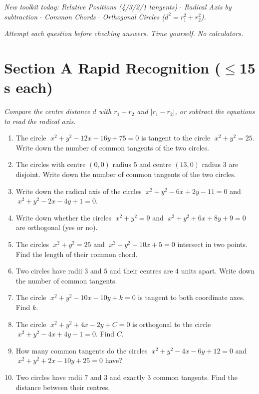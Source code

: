 \documentclass[11pt,a4paper]{article}
\begin{document}
\noindent\textit{New toolkit today: Relative Positions (4/3/2/1 tangents) $\cdot$ Radical Axis by subtraction $\cdot$ Common Chords $\cdot$ Orthogonal Circles ($d^2=r_1^2+r_2^2$).}

\vspace{2pt}
\noindent\textit{Attempt each question before checking answers. Time yourself. No calculators.}

\section*{Section A \quad Rapid Recognition \hfill{\normalfont\small($\leq$15 s each)}}

\noindent\textit{Compare the centre distance $d$ with $r_1+r_2$ and $|r_1-r_2|$, or subtract the equations to read the radical axis.}

\begin{enumerate}

\item The circle $\;x^2+y^2-12x-16y+75=0$ is tangent to the circle $\;x^2+y^2=25$. Write down the number of common tangents of the two circles.

\item The circles with centre $(0,0)$ radius $5$ and centre $(13,0)$ radius $3$ are disjoint. Write down the number of common tangents of the two circles.

\item Write down the radical axis of the circles $\;x^2+y^2-6x+2y-11=0$ and $\;x^2+y^2-2x-4y+1=0$.

\item Write down whether the circles $\;x^2+y^2=9$ and $\;x^2+y^2+6x+8y+9=0$ are orthogonal (yes or no).

\item The circles $\;x^2+y^2=25$ and $\;x^2+y^2-10x+5=0$ intersect in two points. Find the length of their common chord.

\item Two circles have radii $3$ and $5$ and their centres are $4$ units apart. Write down the number of common tangents.

\item The circle $\;x^2+y^2-10x-10y+k=0$ is tangent to both coordinate axes. Find $k$.

\item The circle $\;x^2+y^2+4x-2y+C=0$ is orthogonal to the circle $\;x^2+y^2-4x+4y-1=0$. Find $C$.

\item How many common tangents do the circles $\;x^2+y^2-4x-6y+12=0$ and $\;x^2+y^2+2x-10y+25=0$ have?

\item Two circles have radii $7$ and $3$ and exactly $3$ common tangents. Find the distance between their centres.

\end{enumerate}
\end{document}
